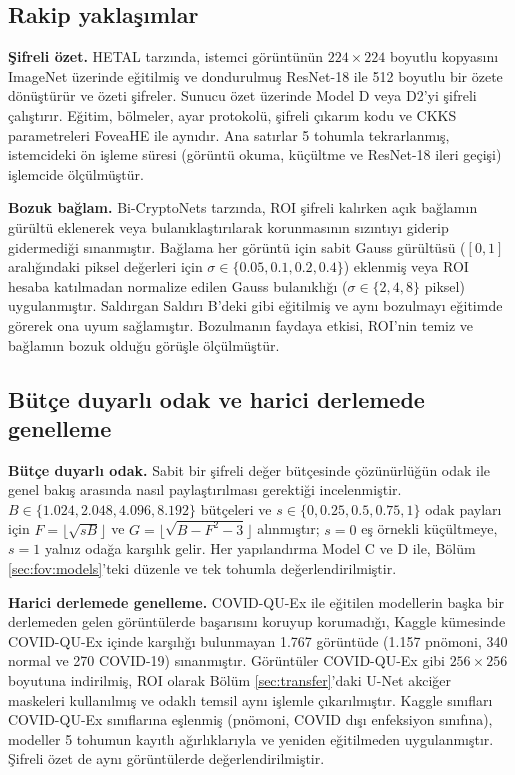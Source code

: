 \subsection{Rakip yaklaşımlar}\label{sec:fov:rivals}

\textbf{Şifreli özet.} HETAL \cite{lee2023hetal} tarzında, istemci görüntünün $224 \times 224$ boyutlu kopyasını ImageNet \cite{deng2009imagenet} üzerinde eğitilmiş ve dondurulmuş ResNet-18 \cite{he2016resnet} ile 512 boyutlu bir özete dönüştürür ve özeti şifreler. Sunucu özet üzerinde Model D veya D2'yi şifreli çalıştırır. Eğitim, bölmeler, ayar protokolü, şifreli çıkarım kodu ve CKKS parametreleri FoveaHE ile aynıdır. Ana satırlar 5 tohumla tekrarlanmış, istemcideki ön işleme süresi (görüntü okuma, küçültme ve ResNet-18 ileri geçişi) işlemcide ölçülmüştür.

\textbf{Bozuk bağlam.} Bi-CryptoNets \cite{yuan2024bicryptonets} tarzında, ROI şifreli kalırken açık bağlamın gürültü eklenerek veya bulanıklaştırılarak korunmasının sızıntıyı giderip gidermediği sınanmıştır. Bağlama her görüntü için sabit Gauss gürültüsü ($[0, 1]$ aralığındaki piksel değerleri için $\sigma \in \{0.05, 0.1, 0.2, 0.4\}$) eklenmiş veya ROI hesaba katılmadan normalize edilen Gauss bulanıklığı ($\sigma \in \{2, 4, 8\}$ piksel) uygulanmıştır. Saldırgan Saldırı B'deki gibi eğitilmiş ve aynı bozulmayı eğitimde görerek ona uyum sağlamıştır. Bozulmanın faydaya etkisi, ROI'nin temiz ve bağlamın bozuk olduğu görüşle ölçülmüştür.

\subsection{Bütçe duyarlı odak ve harici derlemede genelleme}\label{sec:fov:bonus}

\textbf{Bütçe duyarlı odak.} Sabit bir şifreli değer bütçesinde çözünürlüğün odak ile genel bakış arasında nasıl paylaştırılması gerektiği incelenmiştir. $B \in \{1.024, 2.048, 4.096, 8.192\}$ bütçeleri ve $s \in \{0, 0.25, 0.5, 0.75, 1\}$ odak payları için $F = \lfloor \sqrt{sB} \rfloor$ ve $G = \lfloor \sqrt{B - F^2 - 3} \rfloor$ alınmıştır; $s = 0$ eş örnekli küçültmeye, $s = 1$ yalnız odağa karşılık gelir. Her yapılandırma Model C ve D ile, Bölüm \ref{sec:fov:models}'teki düzenle ve tek tohumla değerlendirilmiştir.

\textbf{Harici derlemede genelleme.} COVID-QU-Ex ile eğitilen modellerin başka bir derlemeden gelen görüntülerde başarısını koruyup korumadığı, Kaggle kümesinde COVID-QU-Ex içinde karşılığı bulunmayan 1.767 görüntüde (1.157 pnömoni, 340 normal ve 270 COVID-19) sınanmıştır. Görüntüler COVID-QU-Ex gibi $256 \times 256$ boyutuna indirilmiş, ROI olarak Bölüm \ref{sec:transfer}'daki U-Net akciğer maskeleri kullanılmış ve odaklı temsil aynı işlemle çıkarılmıştır. Kaggle sınıfları COVID-QU-Ex sınıflarına eşlenmiş (pnömoni, COVID dışı enfeksiyon sınıfına), modeller 5 tohumun kayıtlı ağırlıklarıyla ve yeniden eğitilmeden uygulanmıştır. Şifreli özet de aynı görüntülerde değerlendirilmiştir.

